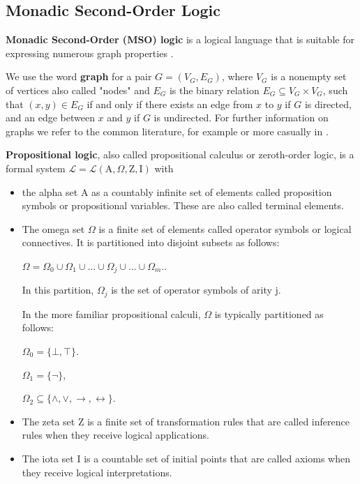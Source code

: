 \documentclass[a4paper, 12pt, bibliography=totoc]{scrartcl}
\begin{document}
\subsection{Monadic Second-Order Logic}

\textbf{Monadic Second-Order (MSO) logic} is a logical language that is suitable for expressing numerous graph properties \cite{Courcelle2012}. 

We use the word \textbf{graph} for a pair $G=(V_{G},E_{G})$, where $V_{G}$ is a nonempty set of vertices also called "nodes" and $E_{G}$ is the binary relation $E_{G} \subseteq V_{G} \times V_{G}$, such that $(x,y)\in E_{G}$ if and only if there exists an edge from $x$ to $y$ if $G$ is directed, and an edge between $x$ and $y$ if $G$ is undirected. For further information on graphs we refer to the common literature, for example \cite{HandbookMathGraph} or more casually in \cite{britannicagraphs}. 

\textbf{Propositional logic}, also called propositional calculus or zeroth-order logic, is a formal system $\mathcal{L} = \mathcal{L}(\mathrm {A},\Omega, \mathrm{Z}, \mathrm{I})$ with
\begin{itemize}
	\item the alpha set $\mathrm {A}$ as a countably infinite set of elements called proposition symbols or propositional variables. These are also called terminal elements.
	\item The omega set $\Omega$ is a finite set of elements called operator symbols or logical connectives. It is partitioned into disjoint subsets as follows:
	
	$\Omega =\Omega _{0}\cup \Omega _{1}\cup \ldots \cup \Omega _{j}\cup \ldots \cup \Omega _{m}.$.
	
	In this partition, $\Omega _{j}$ is the set of operator symbols of arity j.
	
	In the more familiar propositional calculi, $\Omega$ is typically partitioned as follows:
	
	${ \Omega _{0}=\{\bot ,\top \}.}$ 
	
	${\Omega _{1}=\{\lnot \},}$
	
	${ \Omega _{2}\subseteq \{\land ,\lor ,\to ,\leftrightarrow \}.}$

	\item The zeta set $\mathrm {Z}$ is a finite set of transformation rules that are called inference rules when they receive logical applications.
	
	\item The iota set $\mathrm {I}$ is a countable set of initial points that are called axioms when they receive logical interpretations.
\end{itemize}
\end{document}
